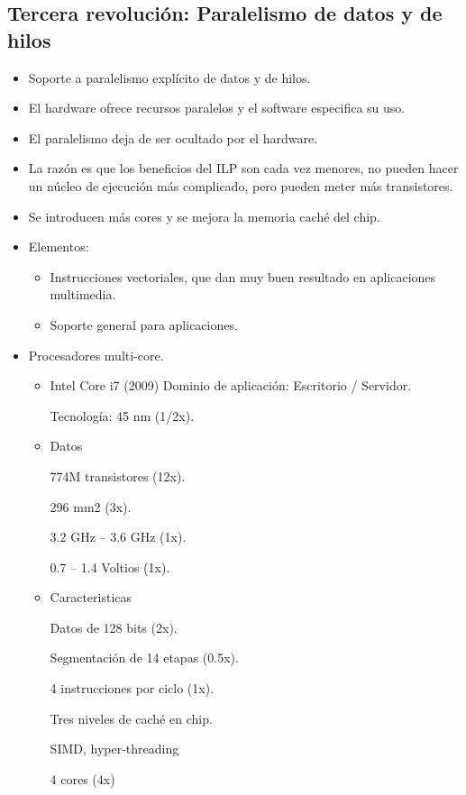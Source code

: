 \documentclass[12pt, twoside, openright]{report} %
\begin{document}
\subsection{Tercera revolución: Paralelismo de datos y de hilos}

\begin{itemize}
	\item Soporte a paralelismo explícito de datos y de hilos.
	\item El hardware ofrece recursos paralelos y el software especifica su
	      uso.
	\item El paralelismo deja de ser ocultado por el hardware.
	\item La razón es que los beneficios del ILP son cada vez menores, no
	      pueden hacer un núcleo de ejecución más complicado, pero pueden
	      meter más transistores.
	\item Se introducen más cores y se mejora la memoria caché del chip.
	\item Elementos:

	      \begin{itemize}

		      \item Instrucciones vectoriales, que dan muy buen resultado en
		            aplicaciones multimedia.
		      \item Soporte general para aplicaciones.
	      \end{itemize}

	\item Procesadores multi-core.
	      \begin{itemize}
		      \item Intel Core i7 (2009)
		            Dominio de aplicación: Escritorio / Servidor.

		            Tecnología: 45 nm (1/2x).

		      \item Datos

		            774M transistores (12x).

		            296 mm2 (3x).

		            3.2 GHz – 3.6 GHz (1x).

		            0.7 – 1.4 Voltios (1x).

		      \item Caracteristicas

		            Datos de 128 bits (2x).

		            Segmentación de 14 etapas (0.5x).

		            4 instrucciones por ciclo (1x).

		            Tres niveles de caché en chip.

		            SIMD, hyper-threading

		            4 cores (4x)
	      \end{itemize}
\end{itemize}
\vspace{-.5cm}
\end{document}
